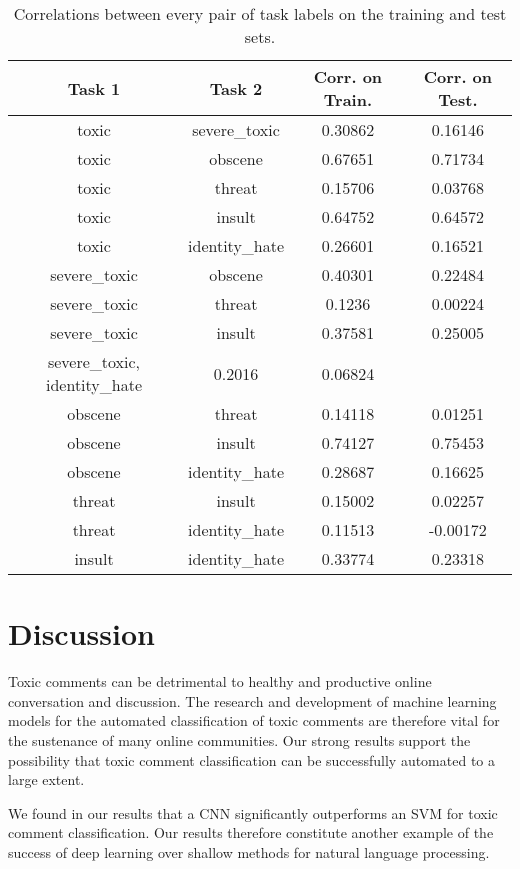 \documentclass[12pt]{article}
\begin{document}
\begin{table}
\centering
\begin{tabular}{|c|c|c|c|} \hline
Task 1 & Task 2 & Corr. on Train. & Corr. on Test. \\ \hline
toxic & severe\_toxic & 0.30862 & 0.16146 \\
toxic & obscene & 0.67651 & 0.71734 \\
toxic & threat & 0.15706 & 0.03768 \\
toxic & insult & 0.64752 & 0.64572 \\
toxic & identity\_hate & 0.26601 & 0.16521 \\
severe\_toxic & obscene & 0.40301 & 0.22484 \\
severe\_toxic & threat & 0.1236 & 0.00224 \\
severe\_toxic & insult & 0.37581 & 0.25005 \\
severe\_toxic, identity\_hate & 0.2016 & 0.06824 \\
obscene & threat & 0.14118 & 0.01251 \\
obscene & insult & 0.74127 & 0.75453 \\
obscene & identity\_hate & 0.28687 & 0.16625 \\
threat & insult & 0.15002 & 0.02257 \\
threat & identity\_hate & 0.11513 & -0.00172 \\
insult & identity\_hate & 0.33774 & 0.23318 \\
\hline
\end{tabular}
\caption{\label{table-corr} Correlations between every pair of task labels on the training and test sets.}
\end{table}


\section{Discussion}

Toxic comments can be detrimental to healthy and productive online conversation and discussion. The research and development of machine learning models for the automated classification of toxic comments are therefore vital for the sustenance of many online communities. Our strong results support the possibility that toxic comment classification can be successfully automated to a large extent.

We found in our results that a CNN significantly outperforms an SVM for toxic comment classification. Our results therefore constitute another example of the success of deep learning over shallow methods for natural language processing.
\end{document}
